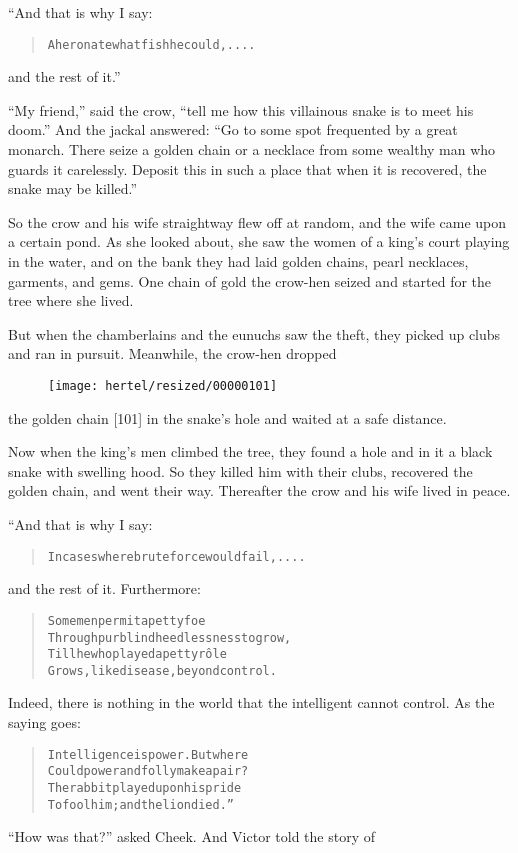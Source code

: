 \documentclass[article, twoside, 10pt]{memoir}
\renewenvironment{verbatim}{%
\begin{quote}%
\vskip -10pt%
\begin{alltt}\normalfont\small}{\end{alltt}%
\end{quote}%
\vskip -10pt
} %
\begin{document}
“And that is why I say:

\begin{verbatim}
A heron ate what fish he could, ....
\end{verbatim}
and the rest of it.”

``My friend,'' said the crow,
``tell me how this villainous snake is to meet his doom.'' And the
jackal answered:
``Go to some spot frequented by a great monarch. There seize a golden chain or a necklace from some wealthy man who guards it carelessly. Deposit this in such a place that when it is recovered, the snake may be killed.''

So the crow and his wife straightway flew off at random, and the
wife came upon a certain pond. As she looked about, she saw the
women of a king's court playing in the water, and on the bank they
had laid golden chains, pearl necklaces, garments, and gems. One
chain of gold the crow-hen seized and started for the tree where
she lived.

But when the chamberlains and the eunuchs saw the theft, they
picked up clubs and ran in pursuit. Meanwhile, the crow-hen dropped
\begin{figure}[p]\texttt{[image: hertel/resized/00000101]}\end{figure}the golden chain [101] in the snake's hole and waited at a safe
distance.

Now when the king's men climbed the tree, they found a hole and in
it a black snake with swelling hood. So they killed him with their
clubs, recovered the golden chain, and went their way. Thereafter
the crow and his wife lived in peace.

“And that is why I say:

\begin{verbatim}
In cases where brute force would fail, ....
\end{verbatim}
and the rest of it. Furthermore:

\begin{verbatim}
Some men permit a petty foe
Through purblind heedlessness to grow,
Till he who played a petty rôle
Grows, like disease, beyond control.
\end{verbatim}
Indeed, there is nothing in the world that the intelligent cannot
control. As the saying goes:

\begin{verbatim}
Intelligence is power. But where
Could power and folly make a pair?
The rabbit played upon his pride
To fool him; and the lion died.”
\end{verbatim}
``How was that?'' asked Cheek. And Victor told the story of
\end{document}
